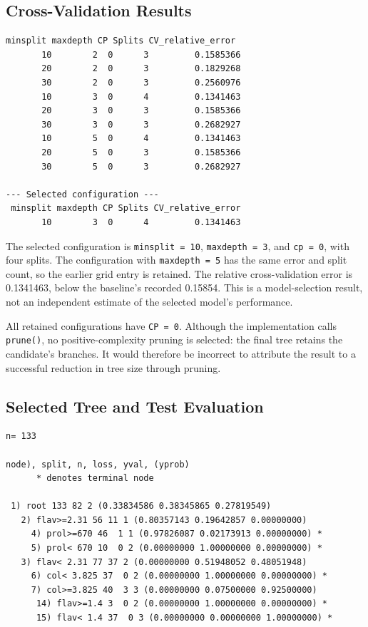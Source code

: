 \documentclass[11pt,a4paper]{article}
\begin{document}
\subsection{Cross-Validation Results}
\par\noindent\begin{minipage}{\linewidth}
  \begin{lstlisting}[style=console]
minsplit maxdepth CP Splits CV_relative_error
       10        2  0      3         0.1585366
       20        2  0      3         0.1829268
       30        2  0      3         0.2560976
       10        3  0      4         0.1341463
       20        3  0      3         0.1585366
       30        3  0      3         0.2682927
       10        5  0      4         0.1341463
       20        5  0      3         0.1585366
       30        5  0      3         0.2682927

--- Selected configuration ---
 minsplit maxdepth CP Splits CV_relative_error
       10        3  0      4         0.1341463
\end{lstlisting}
\end{minipage}\par

The selected configuration is \texttt{minsplit = 10}, \texttt{maxdepth = 3}, and \texttt{cp = 0}, with four splits. The configuration with \texttt{maxdepth = 5} has the same error and split count, so the earlier grid entry is retained. The relative cross-validation error is 0.1341463, below the baseline's recorded 0.15854. This is a model-selection result, not an independent estimate of the selected model's performance.

All retained configurations have \texttt{CP = 0}. Although the implementation calls \texttt{prune()}, no positive-complexity pruning is selected: the final tree retains the candidate's branches. It would therefore be incorrect to attribute the result to a successful reduction in tree size through pruning.

\subsection{Selected Tree and Test Evaluation}
\par\noindent\begin{minipage}{\linewidth}
  \begin{lstlisting}[style=console]
n= 133 

node), split, n, loss, yval, (yprob)
      * denotes terminal node

 1) root 133 82 2 (0.33834586 0.38345865 0.27819549)  
   2) flav>=2.31 56 11 1 (0.80357143 0.19642857 0.00000000)  
     4) prol>=670 46  1 1 (0.97826087 0.02173913 0.00000000) *
     5) prol< 670 10  0 2 (0.00000000 1.00000000 0.00000000) *
   3) flav< 2.31 77 37 2 (0.00000000 0.51948052 0.48051948)  
     6) col< 3.825 37  0 2 (0.00000000 1.00000000 0.00000000) *
     7) col>=3.825 40  3 3 (0.00000000 0.07500000 0.92500000)  
      14) flav>=1.4 3  0 2 (0.00000000 1.00000000 0.00000000) *
      15) flav< 1.4 37  0 3 (0.00000000 0.00000000 1.00000000) *
\end{lstlisting}
\end{minipage}\par
\end{document}
